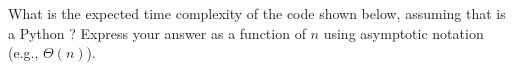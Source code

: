 \begin{prob}
    What is the expected time complexity of the code shown below, assuming that
     is a Python ? Express your answer as a function
    of $n$ using asymptotic notation (e.g., $\Theta(n)$).

    \inputminted[lastline=12]{python}{\thisdir/code.py}


\end{prob}

